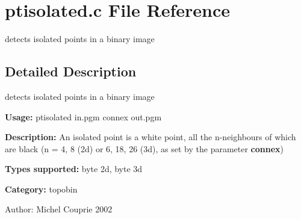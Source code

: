 \section{ptisolated.c File Reference}
\label{ptisolated_8c}
detects isolated points in a binary image 



\subsection{Detailed Description}
detects isolated points in a binary image 

{\bf Usage:} ptisolated in.pgm connex out.pgm

{\bf Description:} An isolated point is a white point, all the n-neighbours of which are black (n = 4, 8 (2d) or 6, 18, 26 (3d), as set by the parameter {\bf connex})

{\bf Types supported:} byte 2d, byte 3d

{\bf Category:} topobin

\begin{Desc}
\item[Author:]Michel Couprie 2002 \end{Desc}
